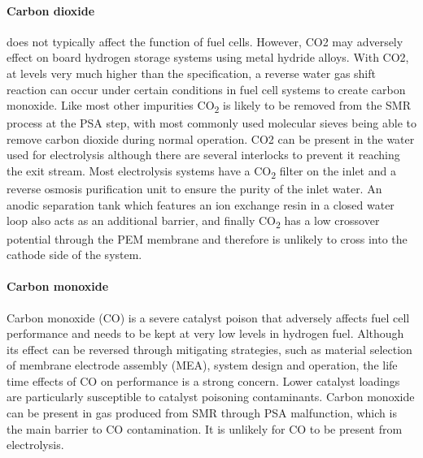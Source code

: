 \paragraph{Carbon dioxide} 
does not typically affect the function of fuel cells. However, CO2 may adversely effect on board hydrogen 
storage systems using metal hydride alloys. With CO2, at levels very much higher than the specification, a 
reverse water gas shift reaction can occur under certain conditions in fuel cell systems to create carbon 
monoxide.
Like most other impurities CO\textsubscript{2} is likely to be removed from the SMR process at the PSA step, with most 
commonly used molecular sieves being able to remove carbon dioxide during normal operation.
CO2 can be present in the water used for electrolysis although there are several interlocks to prevent 
it reaching the exit stream. Most electrolysis systems have a CO\textsubscript{2} filter on the inlet and a reverse osmosis 
purification unit to ensure the purity of the inlet water.  An anodic separation tank which features an ion 
exchange resin in a closed water loop also acts as an additional barrier, and finally CO\textsubscript{2} has a low 
crossover potential through the PEM membrane and therefore is unlikely to cross into the cathode side of 
the system.

\paragraph{Carbon monoxide}
Carbon monoxide (CO) is a severe catalyst poison that adversely affects fuel cell performance and needs 
to be kept at very low levels in hydrogen fuel. Although its effect can be reversed through mitigating 
strategies, such as material selection of membrane electrode assembly (MEA), system design and operation, 
the life time effects of CO on performance is a strong concern. Lower catalyst loadings are particularly 
susceptible to catalyst poisoning contaminants.
Carbon monoxide can be present in gas produced from SMR through PSA malfunction, which is the main barrier 
to CO contamination. It is unlikely for CO to be present from electrolysis.

